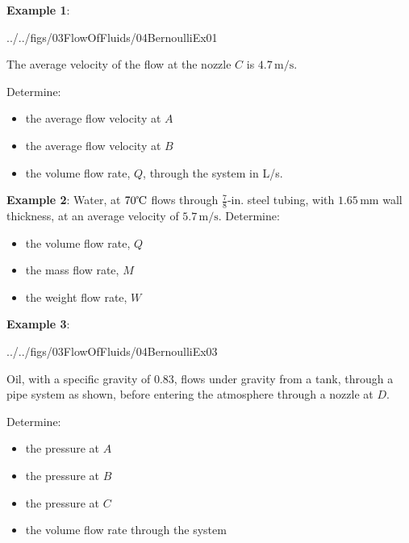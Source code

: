\documentclass[10pt]{amsart}
\begin{document}
\begin{minipage}{0.5\textwidth}
	\raggedright
	\textbf{Example 1}:
	\begin{cfig}[0.5]{../../figs/03FlowOfFluids/04BernoulliEx01}\end{cfig}
	The average velocity of the flow at the nozzle $C$ is $4.7\,\text{m/s}$.\par
	
	Determine:
	\begin{itemize}
		\item the average flow velocity at $A$
		\item the average flow velocity at $B$
		\item the volume flow rate, $Q$, through the system in L/s.
	\end{itemize}
	
\end{minipage}
\newpage
\begin{minipage}[t]{0.45\textwidth}
	\raggedright
	\textbf{Example 2}:\parb
	Water, at $70\text{\textcelsius}$ flows through $\tfrac78\text{-in.}$ steel tubing, with $1.65\,\text{mm}$
	wall thickness, at an average velocity of $5.7\,\text{m/s}$. Determine:
	\begin{itemize}
		\item the volume flow rate, $Q$
		\item the mass flow rate, $M$
		\item the weight flow rate, $W$
	\end{itemize}
	
	
\end{minipage}
\newpage


\begin{minipage}[t]{0.45\textwidth}
	\raggedright
	\textbf{Example 3}:\\
	\vspace*{-0.5cm}
	\begin{cfig}[0.5]{../../figs/03FlowOfFluids/04BernoulliEx03}\end{cfig}
	Oil, with a specific gravity of $0.83$, flows under gravity from a tank, through a pipe system as shown, before
	entering the atmosphere through a nozzle at $D$. \par
	Determine:
	\begin{itemize}
		\item the pressure at $A$
		\item the pressure at $B$
		\item the pressure at $C$
		\item the volume flow rate through the system
	\end{itemize}
	
\end{minipage}
\end{document}
